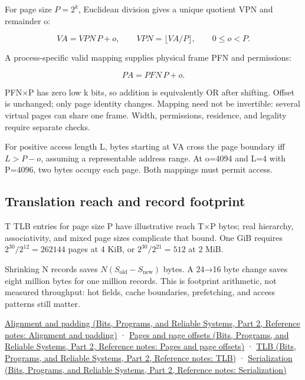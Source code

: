 \hypertarget{03-visual-computing-i-ch018-page-decomposition-and-offset-preservation}{}

For page size \(P=2^k\), Euclidean division gives a unique quotient VPN and remainder o:

\[
VA=VPN\,P+o,\qquad VPN=\lfloor VA/P\rfloor,\qquad 0\le o<P.
\]

A process-specific valid mapping supplies physical frame PFN and permissions:

\[
PA=PFN\,P+o.
\]

PFN×P has zero low k bits, so addition is equivalently OR after shifting. Offset is unchanged; only page identity changes. Mapping need not be invertible: several virtual pages can share one frame. Width, permissions, residence, and legality require separate checks.

For positive access length L, bytes starting at VA cross the page boundary iff \(L>P-o\), assuming a representable address range. At o=4094 and L=4 with P=4096, two bytes occupy each page. Both mappings must permit access.

\subsection{Translation reach and record footprint}\label{03-visual-computing-i-ch018-translation-reach-and-record-footprint}

\hypertarget{03-visual-computing-i-ch018-translation-reach-and-record-footprint}{}

T TLB entries for page size P have illustrative reach T×P bytes; real hierarchy, associativity, and mixed page sizes complicate that bound. One GiB requires \(2^{30}/2^{12}=262144\) pages at 4 KiB, or \(2^{30}/2^{21}=512\) at 2 MiB.

Shrinking N records saves \(N(S_{\mathrm{old}}-S_{\mathrm{new}})\) bytes. A 24→16 byte change saves eight million bytes for one million records. This is footprint arithmetic, not measured throughput: hot fields, cache boundaries, prefetching, and access patterns still matter.

\href{../01-Bits-Programs-and-Reliable-Systems-P02/main.pdf\#nameddest=appendix-a1f7c53b4742}{Alignment and padding (Bits, Programs, and Reliable Systems, Part 2, Reference notes: Alignment and padding)} · \href{../01-Bits-Programs-and-Reliable-Systems-P02/main.pdf\#nameddest=appendix-0c67cd5bf30a}{Pages and page offsets (Bits, Programs, and Reliable Systems, Part 2, Reference notes: Pages and page offsets)} · \href{../01-Bits-Programs-and-Reliable-Systems-P02/main.pdf\#nameddest=appendix-7a2d9c5ce511}{TLB (Bits, Programs, and Reliable Systems, Part 2, Reference notes: TLB)} · \href{../01-Bits-Programs-and-Reliable-Systems-P02/main.pdf\#nameddest=appendix-91d09ebed979}{Serialization (Bits, Programs, and Reliable Systems, Part 2, Reference notes: Serialization)}


